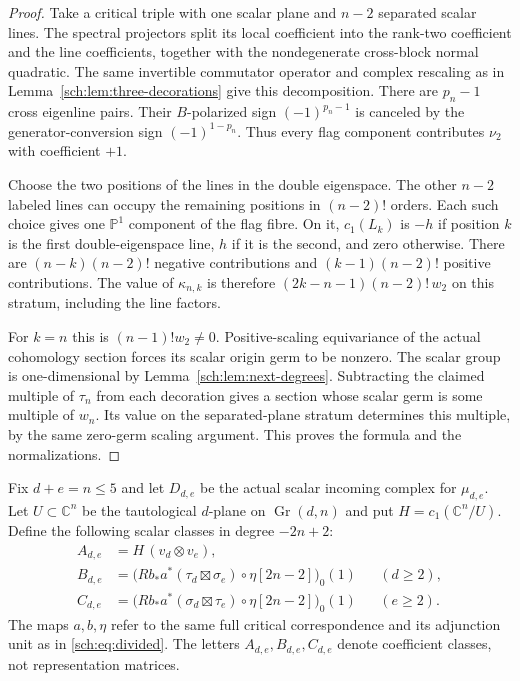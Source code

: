 \begin{proof}
Take a critical triple with one scalar plane and $n-2$ separated
scalar lines. The spectral projectors split its local coefficient
into the rank-two coefficient and the line coefficients, together
with the nondegenerate cross-block normal quadratic.
The same invertible commutator operator and complex rescaling as in
Lemma~\ref{sch:lem:three-decorations} give this decomposition.
There are $p_n-1$ cross eigenline pairs. Their $B$-polarized sign
$(-1)^{p_n-1}$ is canceled by the generator-conversion sign
$(-1)^{1-p_n}$. Thus every flag component contributes $\nu_2$
with coefficient $+1$.

Choose the two positions of the lines in the double eigenspace.
The other $n-2$ labeled lines can occupy the remaining positions
in $(n-2)!$ orders. Each such choice gives one $\mathbb P^1$
component of the flag fibre. On it, $c_1(L_k)$ is $-h$ if
position $k$ is the first double-eigenspace line, $h$ if it is
the second, and zero otherwise.
There are $(n-k)(n-2)!$ negative contributions and
$(k-1)(n-2)!$ positive contributions.
The value of $\kappa_{n,k}$ is therefore
$(2k-n-1)(n-2)!\,w_2$ on this stratum, including the line factors.

For $k=n$ this is $(n-1)!w_2\ne0$.
Positive-scaling equivariance of the actual cohomology section forces
its scalar origin germ to be nonzero.
The scalar group is one-dimensional by
Lemma~\ref{sch:lem:next-degrees}.
Subtracting the claimed multiple of $\tau_n$ from each decoration
gives a section whose scalar germ is some multiple of $w_n$.
Its value on the separated-plane stratum determines this multiple,
by the same zero-germ scaling argument.
This proves the formula and the normalizations.
\end{proof}

Fix $d+e=n\leq5$ and let $D_{d,e}$ be the actual scalar incoming
complex for $\mu_{d,e}$. Let $U\subset\mathbb C^n$ be the
tautological $d$-plane on $\operatorname{Gr}(d,n)$ and put
$H=c_1(\mathbb C^n/U)$.
Define the following scalar classes in degree $-2n+2$:
\[
 \begin{aligned}
 A_{d,e}&=H\,(v_d\otimes v_e),\\
 B_{d,e}&=\bigl(Rb_*a^*(\tau_d\boxtimes\sigma_e)
                             \circ\eta[2n-2]\bigr)_0(1)
                                      &&(d\geq2),\\
 C_{d,e}&=\bigl(Rb_*a^*(\sigma_d\boxtimes\tau_e)
                             \circ\eta[2n-2]\bigr)_0(1)
                                      &&(e\geq2).
 \end{aligned}
\]
The maps $a,b,\eta$ refer to the same full critical correspondence
and its adjunction unit as in \eqref{sch:eq:divided}.
The letters $A_{d,e},B_{d,e},C_{d,e}$ denote coefficient classes,
not representation matrices.

